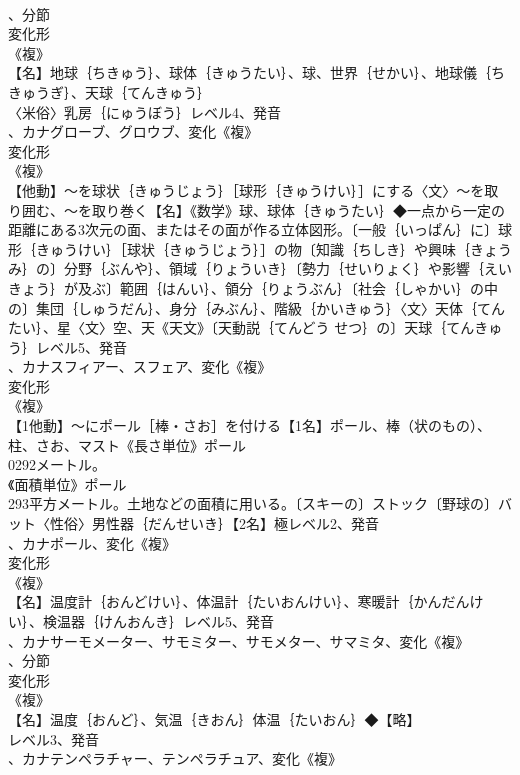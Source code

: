 \documentclass[8pt]{extreport}
\begin{document}
\begin{CJK}{UTF8}{min}
\\	、分節
\\	変化形 
\\	《複》
\\	【名】地球｛ちきゅう｝、球体｛きゅうたい｝、球、世界｛せかい｝、地球儀｛ちきゅうぎ｝、天球｛てんきゅう｝
\\	〈米俗〉乳房｛にゅうぼう｝レベル4、発音
\\	、カナグローブ、グロウブ、変化《複》
\\	変化形 
\\	《複》
\\	【他動】～を球状｛きゅうじょう｝［球形｛きゅうけい｝］にする〈文〉～を取り囲む、～を取り巻く【名】《数学》球、球体｛きゅうたい｝◆一点から一定の距離にある3次元の面、またはその面が作る立体図形。〔一般｛いっぱん｝に〕球形｛きゅうけい｝［球状｛きゅうじょう｝］の物〔知識｛ちしき｝や興味｛きょうみ｝の〕分野｛ぶんや｝、領域｛りょういき｝〔勢力｛せいりょく｝や影響｛えいきょう｝が及ぶ〕範囲｛はんい｝、領分｛りょうぶん｝〔社会｛しゃかい｝の中の〕集団｛しゅうだん｝、身分｛みぶん｝、階級｛かいきゅう｝〈文〉天体｛てんたい｝、星〈文〉空、天《天文》〔天動説｛てんどう せつ｝の〕天球｛てんきゅう｝レベル5、発音
\\	、カナスフィアー、スフェア、変化《複》
\\	変化形 
\\	《複》
\\	【1他動】～にポール［棒・さお］を付ける【1名】ポール、棒（状のもの）、柱、さお、マスト《長さ単位》ポール
\\	0292メートル。
\\	《面積単位》ポール
\\	293平方メートル。土地などの面積に用いる。〔スキーの〕ストック〔野球の〕バット〈性俗〉男性器｛だんせいき｝【2名】極レベル2、発音
\\	、カナポール、変化《複》
\\	変化形 
\\	《複》
\\	【名】温度計｛おんどけい｝、体温計｛たいおんけい｝、寒暖計｛かんだんけい｝、検温器｛けんおんき｝レベル5、発音
\\	、カナサーモメーター、サモミター、サモメター、サマミタ、変化《複》
\\	、分節
\\	変化形 
\\	《複》
\\	【名】温度｛おんど｝、気温｛きおん｝体温｛たいおん｝◆【略】
\\	レベル3、発音
\\	、カナテンペラチャー、テンペラチュア、変化《複》

\end{CJK}
\end{document}
